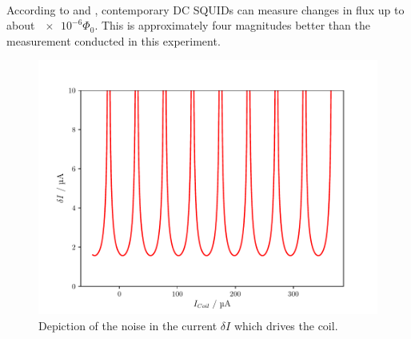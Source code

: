 \documentclass[a4paper,10pt]{article}
\begin{document}
\\
According to \cite{drung} and \cite{kleiner}, contemporary DC SQUIDs can measure changes in flux up to about $\num{e-6} \Phi_0$. This is approximately four magnitudes better than the measurement conducted in this experiment. 
\begin{figure}[htp!]
    \centering
    \includegraphics[width = 0.6 \textwidth]{noise.pdf}
    \caption{Depiction of the noise in the current $\delta I$ which drives the coil. }
    \label{fig_noise}
\end{figure}
\end{document}
